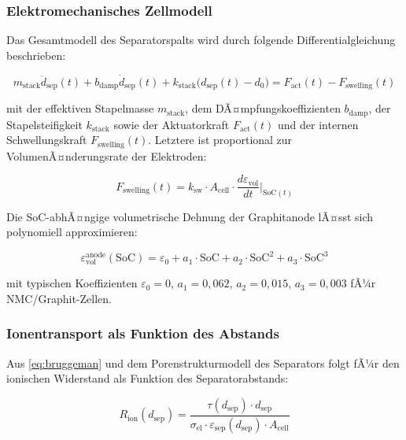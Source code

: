 ﻿\documentclass[12pt,a4paper]{article}
\begin{document}
\subsubsection{Elektromechanisches Zellmodell}

Das Gesamtmodell des Separatorspalts wird durch folgende Differentialgleichung
beschrieben:

\begin{equation}
	m_\mathrm{stack} \ddot{d}_\mathrm{sep}(t) + b_\mathrm{damp} \dot{d}_\mathrm{sep}(t)
	+ k_\mathrm{stack}\bigl(d_\mathrm{sep}(t) - d_0\bigr) = F_\mathrm{act}(t) - F_\mathrm{swelling}(t)
	\label{eq:mech_ode}
\end{equation}

mit der effektiven Stapelmasse $m_\mathrm{stack}$, dem DÃ¤mpfungskoeffizienten
$b_\mathrm{damp}$, der Stapelsteifigkeit $k_\mathrm{stack}$ sowie der
Aktuatorkraft $F_\mathrm{act}(t)$ und der internen Schwellungskraft
$F_\mathrm{swelling}(t)$. Letztere ist proportional zur VolumenÃ¤nderungsrate
der Elektroden:

\begin{equation}
	F_\mathrm{swelling}(t) = k_\mathrm{sw} \cdot A_\mathrm{cell} \cdot
	\frac{d\varepsilon_\mathrm{vol}}{dt}\bigg|_{\mathrm{SoC}(t)}
	\label{eq:swelling_force}
\end{equation}

Die SoC-abhÃ¤ngige volumetrische Dehnung der Graphitanode lÃ¤sst sich
polynomiell approximieren:

\begin{equation}
	\varepsilon_\mathrm{vol}^\mathrm{anode}(\mathrm{SoC}) =
	\varepsilon_0 + a_1 \cdot \mathrm{SoC} + a_2 \cdot \mathrm{SoC}^2 + a_3 \cdot \mathrm{SoC}^3
	\label{eq:swelling_soc}
\end{equation}

mit typischen Koeffizienten $\varepsilon_0 = 0$, $a_1 = 0{,}062$, $a_2 = 0{,}015$,
$a_3 = 0{,}003$ fÃ¼r NMC/Graphit-Zellen.

\subsubsection{Ionentransport als Funktion des Abstands}

Aus \eqref{eq:bruggeman} und dem Porenstrukturmodell des Separators folgt fÃ¼r
den ionischen Widerstand als Funktion des Separatorabstands:

\begin{equation}
	R_\mathrm{ion}(d_\mathrm{sep}) = \frac{\tau(d_\mathrm{sep}) \cdot d_\mathrm{sep}}
	{\sigma_\mathrm{el} \cdot \varepsilon_\mathrm{sep}(d_\mathrm{sep}) \cdot A_\mathrm{cell}}
	\label{eq:r_ion_d}
\end{equation}
\end{document}
